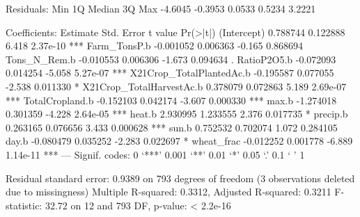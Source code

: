 \documentclass{report}
\begin{document}
\begin{Schunk}
\begin{Soutput}
Residuals:
    Min      1Q  Median      3Q     Max 
-4.6045 -0.3953  0.0533  0.5234  3.2221 

Coefficients:
                          Estimate Std. Error t value Pr(>|t|)    
(Intercept)               0.788744   0.122888   6.418 2.37e-10 ***
Farm_TonsP.b             -0.001052   0.006363  -0.165 0.868694    
Tons_N_Rem.b             -0.010553   0.006306  -1.673 0.094634 .  
RatioP2O5.b              -0.072093   0.014254  -5.058 5.27e-07 ***
X21Crop_TotalPlantedAc.b -0.195587   0.077055  -2.538 0.011330 *  
X21Crop_TotalHarvestAc.b  0.378079   0.072863   5.189 2.69e-07 ***
TotalCropland.b          -0.152103   0.042174  -3.607 0.000330 ***
max.b                    -1.274018   0.301359  -4.228 2.64e-05 ***
heat.b                    2.930995   1.233555   2.376 0.017735 *  
precip.b                  0.263165   0.076656   3.433 0.000628 ***
sun.b                     0.752532   0.702074   1.072 0.284105    
day.b                    -0.080479   0.035252  -2.283 0.022697 *  
wheat_frac               -0.012252   0.001778  -6.889 1.14e-11 ***
---
Signif. codes:  0 ‘***’ 0.001 ‘**’ 0.01 ‘*’ 0.05 ‘.’ 0.1 ‘ ’ 1

Residual standard error: 0.9389 on 793 degrees of freedom
  (3 observations deleted due to missingness)
Multiple R-squared:  0.3312,	Adjusted R-squared:  0.3211 
F-statistic: 32.72 on 12 and 793 DF,  p-value: < 2.2e-16
\end{Soutput}
\end{Schunk}
\end{document}
